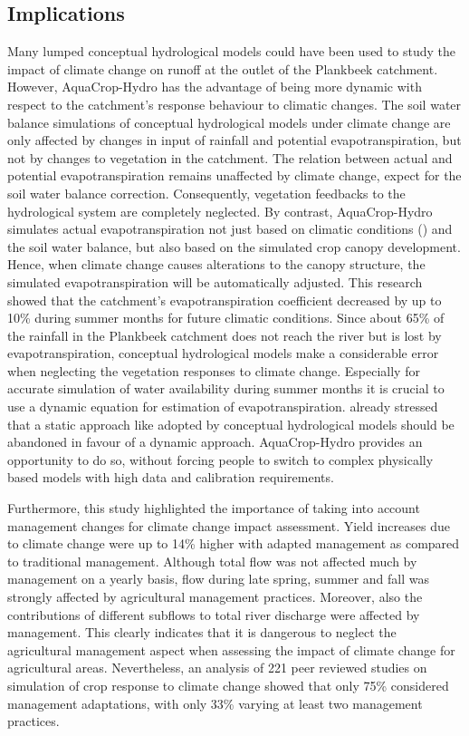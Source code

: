 \subsection{Implications} 
Many lumped conceptual hydrological models could have been used to study the impact of climate change on runoff at the outlet of the Plankbeek catchment. However, AquaCrop-Hydro has the advantage of being more dynamic with respect to the catchment's response behaviour to climatic changes. The soil water balance simulations of conceptual hydrological models under climate change are only affected by changes in input of rainfall and potential evapotranspiration, but not by changes to vegetation in the catchment. The relation between actual and potential evapotranspiration remains unaffected by climate change, expect for the soil water balance correction. Consequently, vegetation feedbacks to the hydrological system are completely neglected. By contrast, AquaCrop-Hydro simulates actual evapotranspiration not just based on climatic conditions (\ETo) and the soil water balance, but also based on the simulated crop canopy development. Hence, when climate change causes alterations to the canopy structure, the simulated evapotranspiration will be automatically adjusted. This research showed that the catchment's evapotranspiration coefficient decreased by up to 10\% during summer months for future climatic conditions. Since about 65\% of the rainfall in the Plankbeek catchment does not reach the river but is lost by evapotranspiration, conceptual hydrological models make a considerable error when neglecting the vegetation responses to climate change. Especially for accurate simulation of water availability during summer months it is crucial to use a dynamic equation for estimation of evapotranspiration. \textcite{vanwalsum2012} already stressed that a static approach like adopted by conceptual hydrological models should be abandoned in favour of a dynamic approach. AquaCrop-Hydro provides an opportunity to do so, without forcing people to switch to complex physically based models with high data and calibration requirements.

Furthermore, this study highlighted the importance of taking into account management changes for climate change impact assessment. Yield increases due to climate change were up to 14\% higher with adapted management as compared to traditional management. Although total flow was not affected much by management on a yearly basis, flow during late spring, summer and fall was strongly affected by agricultural management practices. Moreover, also the contributions of different subflows to total river discharge were affected by management. This clearly indicates that it is dangerous to neglect the agricultural management aspect when assessing the impact of climate change for agricultural areas. Nevertheless, an analysis of 221 peer reviewed studies on simulation of crop response to climate change showed that only 75\% considered management adaptations, with only 33\% varying at least two management practices.  

